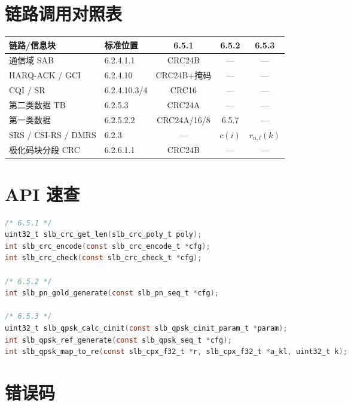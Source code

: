 \documentclass[11pt,a4paper]{ctexart}
\begin{document}
\section{链路调用对照表}

\begin{table}[h]
\centering
\small
\begin{tabular}{llccc}
\toprule
\textbf{链路/信息块} & \textbf{标准位置} & \textbf{6.5.1} & \textbf{6.5.2} & \textbf{6.5.3} \\
\midrule
通信域 SAB & 6.2.4.1.1 & CRC24B & --- & --- \\
HARQ-ACK / GCI & 6.2.4.10 & CRC24B+掩码 & --- & --- \\
CQI / SR & 6.2.4.10.3/4 & CRC16 & --- & --- \\
第二类数据 TB & 6.2.5.3 & CRC24A & --- & --- \\
第一类数据 & 6.2.5.2.2 & CRC24A/16/8 & 6.5.7 & --- \\
SRS / CSI-RS / DMRS & 6.2.3 & --- & $c(i)$ & $r_{n,l}(k)$ \\
极化码块分段 CRC & 6.2.6.1.1 & CRC24B & --- & --- \\
\bottomrule
\end{tabular}
\end{table}

\section{API 速查}

\begin{lstlisting}[language=C]
/* 6.5.1 */
uint32_t slb_crc_get_len(slb_crc_poly_t poly);
int slb_crc_encode(const slb_crc_encode_t *cfg);
int slb_crc_check(const slb_crc_check_t *cfg);

/* 6.5.2 */
int slb_pn_gold_generate(const slb_pn_seq_t *cfg);

/* 6.5.3 */
uint32_t slb_qpsk_calc_cinit(const slb_qpsk_cinit_param_t *param);
int slb_qpsk_ref_generate(const slb_qpsk_seq_t *cfg);
int slb_qpsk_map_to_re(const slb_cpx_f32_t *r, slb_cpx_f32_t *a_kl, uint32_t k);
\end{lstlisting}

\section{错误码}
\end{document}
